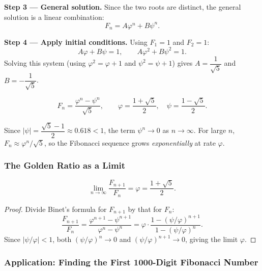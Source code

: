 \textbf{Step 3 — General solution.} Since the two roots are distinct, the general solution is a linear combination:
\[
F_n = A\varphi^n + B\psi^n.
\]

\textbf{Step 4 — Apply initial conditions.} Using $F_1 = 1$ and $F_2 = 1$:
\[
A\varphi + B\psi = 1, \qquad A\varphi^2 + B\psi^2 = 1.
\]
Solving this system (using $\varphi^2 = \varphi+1$ and $\psi^2 = \psi+1$) gives $A = \dfrac{1}{\sqrt{5}}$ and $B = -\dfrac{1}{\sqrt{5}}$.

\begin{theorem}
\[
\boxed{F_n = \frac{\varphi^n - \psi^n}{\sqrt{5}}}, \qquad \varphi = \frac{1+\sqrt{5}}{2},\quad \psi = \frac{1-\sqrt{5}}{2}.
\]
\end{theorem}

\begin{remark}
Since $|\psi| = \dfrac{\sqrt{5}-1}{2} \approx 0.618 < 1$, the term $\psi^n \to 0$ as $n\to\infty$. For large $n$, $F_n \approx \varphi^n/\sqrt{5}$, so the Fibonacci sequence grows \emph{exponentially} at rate $\varphi$.
\end{remark}

\subsubsection*{The Golden Ratio as a Limit}

\begin{theorem}
\[
\lim_{n\to\infty}\frac{F_{n+1}}{F_n} = \varphi = \frac{1+\sqrt{5}}{2}.
\]
\end{theorem}

\begin{proof}
Divide Binet's formula for $F_{n+1}$ by that for $F_n$:
\[
\frac{F_{n+1}}{F_n} = \frac{\varphi^{n+1} - \psi^{n+1}}{\varphi^n - \psi^n} = \varphi\cdot\frac{1 - (\psi/\varphi)^{n+1}}{1 - (\psi/\varphi)^n}.
\]
Since $|\psi/\varphi| < 1$, both $(\psi/\varphi)^n \to 0$ and $(\psi/\varphi)^{n+1} \to 0$, giving the limit $\varphi$.
\end{proof}

\subsubsection*{Application: Finding the First 1000-Digit Fibonacci Number}

